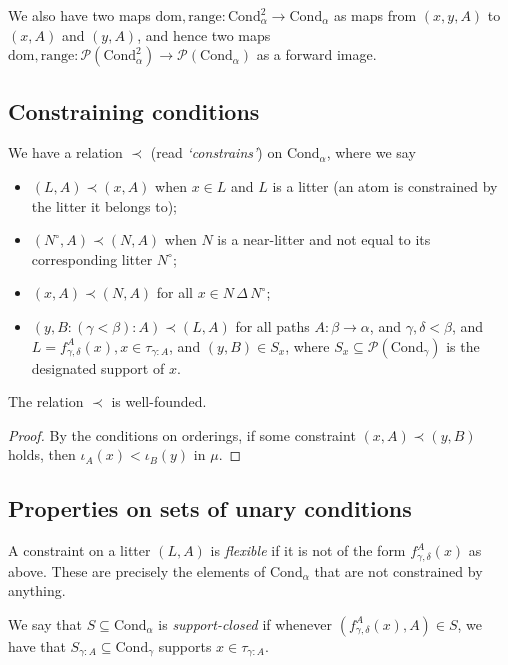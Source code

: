 \documentclass[a4paper]{article}
\begin{document}
We also have two maps \( \mathrm{dom, range} \colon \mathrm{Cond}_\alpha^2 \to \mathrm{Cond}_\alpha \) as maps from \( (x,y,A) \) to \( (x,A) \) and \( (y,A) \), and hence two maps \( \mathrm{dom, range} \colon \mathcal P(\mathrm{Cond}_\alpha^2) \to \mathcal P(\mathrm{Cond}_\alpha) \) as a forward image.

\subsection{Constraining conditions}
We have a relation \( \prec \) (read \textit{`constrains'}) on \( \mathrm{Cond}_\alpha \), where we say
\begin{itemize}
  \item \( (L, A) \prec (x, A) \) when \( x \in L \) and \( L \) is a litter (an atom is constrained by the litter it belongs to);
  \item \( (N^\circ, A) \prec (N, A) \) when \( N \) is a near-litter and not equal to its corresponding litter \( N^\circ \);
  \item \( (x, A) \prec (N, A) \) for all \( x \in N\,\Delta\, N^\circ \);
  \item \( (y, B:(\gamma<\beta):A) \prec (L, A) \) for all paths \( A \colon \beta \to \alpha \), and \( \gamma,\delta < \beta \), and \( L = f^A_{\gamma,\delta}(x), x \in \tau_{\gamma:A} \), and \( (y,B) \in S_x \), where \( S_x \subseteq \mathcal P(\mathrm{Cond}_\gamma) \) is the designated support of \( x \).
\end{itemize}

\begin{proposition}
  The relation \( \prec \) is well-founded.
\end{proposition}
\begin{proof}
  By the conditions on orderings, if some constraint \( (x, A) \prec (y,B) \) holds, then \( \iota_A(x) < \iota_B(y) \) in \( \mu \).
\end{proof}

\subsection{Properties on sets of unary conditions}
A constraint on a litter \( (L,A) \) is \textit{flexible} if it is not of the form \( f^A_{\gamma,\delta}(x) \) as above.
These are precisely the elements of \( \mathrm{Cond}_\alpha \) that are not constrained by anything.

We say that \( S \subseteq \mathrm{Cond}_\alpha \) is \textit{support-closed} if whenever \( (f^A_{\gamma,\delta}(x),A) \in S \), we have that \( S_{\gamma:A} \subseteq \mathrm{Cond}_\gamma \) supports \( x \in \tau_{\gamma:A} \).
\end{document}
